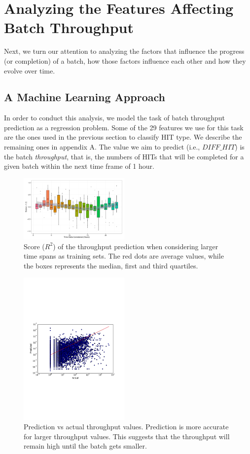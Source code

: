 \section{Analyzing the Features Affecting Batch Throughput}
\label{sec:throughput}
Next, we turn our attention to analyzing the factors that influence the  progress (or completion) of a batch, how those factors influence each other and how they evolve over time.

\subsection{A Machine Learning Approach}
In order to conduct this analysis, we model the task of batch throughput prediction as a regression problem.  Some of the  29  features we use for this task are the ones used in the previous section to classify HIT type.  We describe the remaining ones in appendix A. The value  we aim to predict (i.e.,   $DIFF\_HIT$) is the batch \emph{throughput}, that is, the numbers of HITs that   will be completed for a given batch within the next time frame of 1 hour.

\begin{figure}[tb]
	\centering
		\includegraphics[width=0.48\textwidth]{figures/ML_accuracy}
	\caption{Score ($R^2$) of the throughput prediction when considering larger time spans as training sets. The red dots are average values, while the boxes represents the median, first and third quartiles.}
	\label{fig:accuracy}
\end{figure}

\begin{figure}[tb]
	\centering
		\includegraphics[width=0.48\textwidth]{figures/predictions_3}
	\caption{Prediction vs actual throughput values. Prediction is more accurate for larger throughput values. This suggests that the throughput will remain high until the batch gets smaller.}
	\label{fig:pred}
\end{figure}

